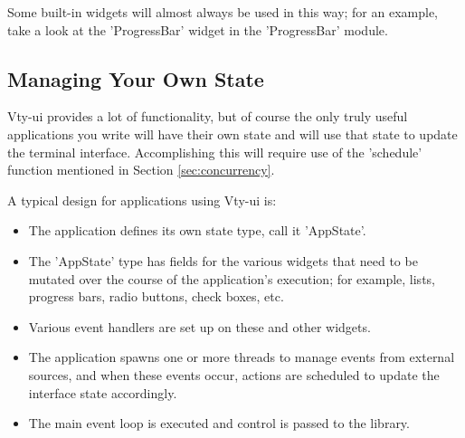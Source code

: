 Some built-in widgets will almost always be used in this way; for an
example, take a look at the 'ProgressBar' widget in the 'ProgressBar'
module.

\subsection{Managing Your Own State}

Vty-ui provides a lot of functionality, but of course the only truly
useful applications you write will have their own state and will use
that state to update the terminal interface.  Accomplishing this will
require use of the 'schedule' function mentioned in Section
\ref{sec:concurrency}.

A typical design for applications using Vty-ui is:

\begin{itemize}
\item The application defines its own state type, call it 'AppState'.
\item The 'AppState' type has fields for the various widgets that need
  to be mutated over the course of the application's execution; for
  example, lists, progress bars, radio buttons, check boxes, etc.
\item Various event handlers are set up on these and other widgets.
\item The application spawns one or more threads to manage events from
  external sources, and when these events occur, actions are scheduled
  to update the interface state accordingly.
\item The main event loop is executed and control is passed to the
  library.
\end{itemize}

